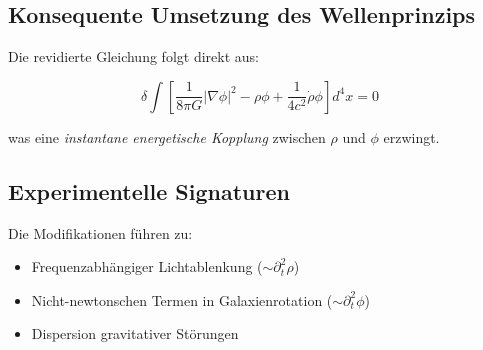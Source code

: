 \subsection{Konsequente Umsetzung des Wellenprinzips}
Die revidierte Gleichung folgt direkt aus:

\begin{equation}
\delta\int\left[\frac{1}{8\pi G}|\nabla\phi|^2 - \rho\phi + \frac{1}{4c^2}\dot{\rho}\phi\right]d^4x = 0
\end{equation}

was eine \emph{instantane energetische Kopplung} zwischen $\rho$ und $\phi$ erzwingt.

\subsection{Experimentelle Signaturen}
Die Modifikationen führen zu:
\begin{itemize}
\item Frequenzabhängiger Lichtablenkung ($\sim\partial_t^2\rho$)
\item Nicht-newtonschen Termen in Galaxienrotation ($\sim\partial_t^2\phi$)
\item Dispersion gravitativer Störungen
\end{itemize}
